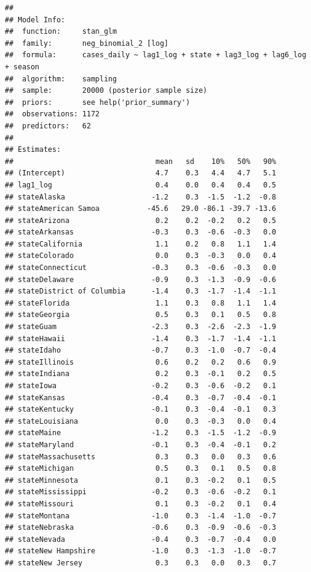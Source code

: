 \documentclass[
]{book}
\begin{document}
\begin{verbatim}
## 
## Model Info:
##  function:     stan_glm
##  family:       neg_binomial_2 [log]
##  formula:      cases_daily ~ lag1_log + state + lag3_log + lag6_log + season
##  algorithm:    sampling
##  sample:       20000 (posterior sample size)
##  priors:       see help('prior_summary')
##  observations: 1172
##  predictors:   62
## 
## Estimates:
##                                 mean   sd    10%   50%   90%
## (Intercept)                     4.7    0.3   4.4   4.7   5.1
## lag1_log                        0.4    0.0   0.4   0.4   0.5
## stateAlaska                    -1.2    0.3  -1.5  -1.2  -0.8
## stateAmerican Samoa           -45.6   29.0 -86.1 -39.7 -13.6
## stateArizona                    0.2    0.2  -0.2   0.2   0.5
## stateArkansas                  -0.3    0.3  -0.6  -0.3   0.0
## stateCalifornia                 1.1    0.2   0.8   1.1   1.4
## stateColorado                   0.0    0.3  -0.3   0.0   0.4
## stateConnecticut               -0.3    0.3  -0.6  -0.3   0.0
## stateDelaware                  -0.9    0.3  -1.3  -0.9  -0.6
## stateDistrict of Columbia      -1.4    0.3  -1.7  -1.4  -1.1
## stateFlorida                    1.1    0.3   0.8   1.1   1.4
## stateGeorgia                    0.5    0.3   0.1   0.5   0.8
## stateGuam                      -2.3    0.3  -2.6  -2.3  -1.9
## stateHawaii                    -1.4    0.3  -1.7  -1.4  -1.1
## stateIdaho                     -0.7    0.3  -1.0  -0.7  -0.4
## stateIllinois                   0.6    0.2   0.2   0.6   0.9
## stateIndiana                    0.2    0.3  -0.1   0.2   0.5
## stateIowa                      -0.2    0.3  -0.6  -0.2   0.1
## stateKansas                    -0.4    0.3  -0.7  -0.4  -0.1
## stateKentucky                  -0.1    0.3  -0.4  -0.1   0.3
## stateLouisiana                  0.0    0.3  -0.3   0.0   0.4
## stateMaine                     -1.2    0.3  -1.5  -1.2  -0.9
## stateMaryland                  -0.1    0.3  -0.4  -0.1   0.2
## stateMassachusetts              0.3    0.3   0.0   0.3   0.6
## stateMichigan                   0.5    0.3   0.1   0.5   0.8
## stateMinnesota                  0.1    0.3  -0.2   0.1   0.5
## stateMississippi               -0.2    0.3  -0.6  -0.2   0.1
## stateMissouri                   0.1    0.3  -0.2   0.1   0.4
## stateMontana                   -1.0    0.3  -1.4  -1.0  -0.7
## stateNebraska                  -0.6    0.3  -0.9  -0.6  -0.3
## stateNevada                    -0.4    0.3  -0.7  -0.4   0.0
## stateNew Hampshire             -1.0    0.3  -1.3  -1.0  -0.7
## stateNew Jersey                 0.3    0.3   0.0   0.3   0.7

\end{verbatim}
\end{document}
